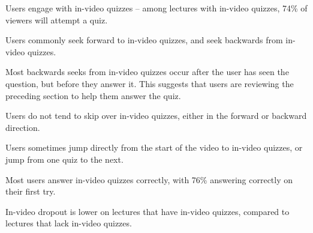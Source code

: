\documentclass{sigchi}
\begin{document}

\begin{compactitem}
\item Users engage with in-video quizzes -- among lectures with in-video quizzes, 74\% of viewers will attempt a quiz. %
\item Users commonly seek forward to in-video quizzes, and seek backwards from in-video quizzes.
\item Most backwards seeks from in-video quizzes occur after the user has seen the question, but before they answer it. This suggests that users are reviewing the preceding section to help them answer the quiz. %
\item Users do not tend to skip over in-video quizzes, either in the forward or backward direction. %
\item Users sometimes jump directly from the start of the video to in-video quizzes, or jump from one quiz to the next. %
\item Most users answer in-video quizzes correctly, with 76\% answering correctly on their first try.
\item In-video dropout is lower on lectures that have in-video quizzes, compared to lectures that lack in-video quizzes.
\end{compactitem}

\end{document}
